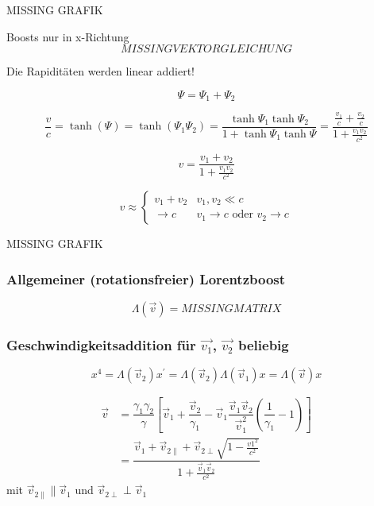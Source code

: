 \documentclass[a4paper, 11pt]{article}
\numberwithin{equation}{section}
\begin{document}
MISSING GRAFIK

Boosts nur in x-Richtung
\begin{equation}
MISSING VEKTORGLEICHUNG
\end{equation}

Die Rapiditäten werden linear addiert!

\begin{equation}
\boxed{
\Psi = \Psi_1 + \Psi_2}
\end{equation}

\begin{equation*}
\dfrac{v}{c} = \tanh (\Psi) = \tanh(\Psi_1 \Psi_2) = \dfrac{\tanh \Psi_1 \tanh\Psi_2}{1+\tanh\Psi_1\tanh\Psi} = \dfrac{\frac{v_1}{c}+ \frac{v_2}{c}}{1 + \frac{v_1v_2}{c^2}}
\end{equation*}


\begin{equation}
\boxed{
v = \dfrac{v_1+v_2}{1+\frac{v_1v_2}{c^2}}}
\end{equation}

\begin{equation*}
v \approx \begin{cases} v_1 + v_2 &    v_1,v_2 \ll c \\
\rightarrow c   &  v_1 \rightarrow c \text{ oder } v_2 \rightarrow c \end{cases}
\end{equation*}

MISSING GRAFIK


\subsubsection*{Allgemeiner (rotationsfreier) Lorentzboost}

\begin{equation}
\Lambda(\vec{v}) = MISSINGMATRIX
\end{equation}

\subsubsection*{Geschwindigkeitsaddition für $\vec{v_1}$, $\vec{v_2}$ beliebig}

\begin{equation*}
x^4 = \Lambda(\vec{v}_2)x^\prime = \Lambda(\vec{v}_2) \Lambda(\vec{v}_1) x = \Lambda(\vec{v})x
\end{equation*}

\begin{equation*}
\begin{aligned}
\vec{v} &= \dfrac{\gamma_1 \gamma_2}{\gamma} \left[ \vec{v}_1 + \dfrac{\vec{v}_2}{\gamma_1} - \vec{v}_1  \dfrac{\vec{v}_1 \vec{v}_2}{\vec{v}_1^2} \left( \dfrac{1}{\gamma_1} -1 \right) \right] \\
&= \dfrac{\vec{v}_1+ \vec{v}_{2 \parallel}+\vec{v}_{2\perp}\sqrt{1-\frac{v1^2}{c^2}}}{1+\frac{\vec{v}_1\vec{v}_2}{c^2}}
\end{aligned}
\end{equation*}
mit $\vec{v}_{2\parallel} \parallel \vec{v}_1$ und $\vec{v}_{2\perp} \perp \vec{v}_1$
\end{document}

